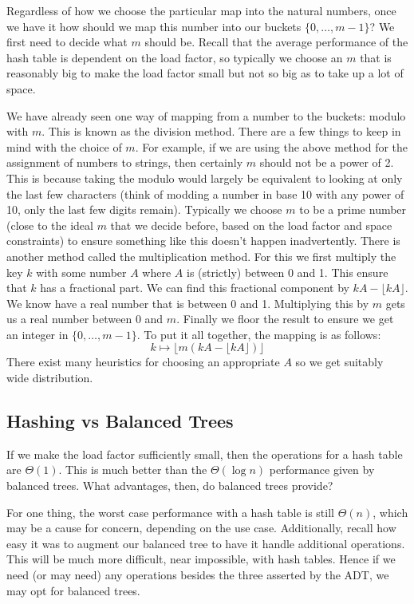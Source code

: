 Regardless of how we choose the particular map into the natural numbers, once we have it how should we map this number into our buckets $\{0, \dots, m - 1\}$? We first need to decide what $m$ should be. Recall that the average performance of the hash table is dependent on the load factor, so typically we choose an $m$ that is reasonably big to make the load factor small but not so big as to take up a lot of space. 

We have already seen one way of mapping from a number to the buckets: modulo with $m$. This is known as the division method. There are a few things to keep in mind with the choice of $m$. For example, if we are using the above method for the assignment of numbers to strings, then certainly $m$ should not be a power of 2. This is because taking the modulo would largely be equivalent to looking at only the last few characters (think of modding a number in base 10 with any power of 10, only the last few digits remain). Typically we choose $m$ to be a prime number (close to the ideal $m$ that we decide before, based on the load factor and space constraints) to ensure something like this doesn't happen inadvertently. There is another method called the multiplication method. For this we first multiply the key $k$ with some number $A$ where $A$ is (strictly) between 0 and 1. This ensure that $k$ has a fractional part. We can find this fractional component by $kA - \lfloor kA \rfloor$. We know have a real number that is between 0 and 1. Multiplying this by $m$ gets us a real number between $0$ and $m$. Finally we floor the result to ensure we get an integer in $\{0, \dots, m - 1\}$. To put it all together, the mapping is as follows:
$$ k \mapsto \lfloor m(kA - \lfloor kA \rfloor) \rfloor $$
There exist many heuristics for choosing an appropriate $A$ so we get suitably wide distribution.

\subsection{Hashing vs Balanced Trees}
If we make the load factor sufficiently small, then the operations for a hash table are $\Theta(1)$. This is much better than the $\Theta(\log n)$ performance given by balanced trees. What advantages, then, do balanced trees provide?

For one thing, the worst case performance with a hash table is still $\Theta(n)$, which may be a cause for concern, depending on the use case. Additionally, recall how easy it was to augment our balanced tree to have it handle additional operations. This will be much more difficult, near impossible, with hash tables. Hence if we need (or may need) any operations besides the three asserted by the ADT, we may opt for balanced trees.

